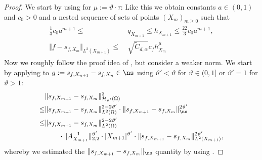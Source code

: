 \documentclass[a4paper, 10pt]{article}
\begin{document}
%
%
%
%
%
%
%
%


\begin{proof}
We start by using  for $\mu := \vartheta \cdot \tau$:
Like this we obtain constants $a \in (0, 1)$ and $c_0 > 0$ and a nested sequence of sets of points $(X_m)_{m \geq 0}$ such that
\begin{align}
\begin{aligned}
\label{eq:proof:properties_sequence}
\frac{1}{3} c_0 a^{m+1} \leq& ~ q_{X_{m+1}} \leq h_{X_{m+1}} \leq \frac{22}{3} c_0 a^{m+1}, \\
%
\Vert f - s_{f, X_m} \Vert_{L^2(X_{m+1})} \leq& ~ \sqrt{\tilde{C}_{d,\alpha}} c_f h_{X_m}^{\mu}
\end{aligned}
\end{align}
Now we roughly follow the proof idea of \cite[Theorem 6.1]{schaback2002inverse}, but consider a weaker norm. %
We start by applying  to $g := s_{f, X_{n+1}} - s_{f, X_n} \in \ns$ using $\vartheta' < \vartheta$ for $\vartheta \in (0, 1]$ or $\vartheta' = 1$ for $\vartheta > 1$:
\begin{align}
\begin{aligned}
\label{eq:application_hoelder}
&\Vert s_{f, X_{m+1}} - s_{f, X_{m}} \Vert_{\mathcal{H}_{\vartheta'}(\Omega)}^2 \\
\leq& \Vert s_{f, X_{m+1}} - s_{f, X_{m}} \Vert_{L^2(\Omega)}^{2 - 2\vartheta'} \cdot \Vert s_{f, X_{m+1}} - s_{f, X_{m}} \Vert_{\ns}^{2\vartheta'} \\
\leq &\Vert s_{f, X_{m+1}} - s_{f, X_{m}} \Vert_{L^2(\Omega)}^{2 - 2\vartheta'} \\ 
&\qquad \cdot \Vert A_{X_{m+1}}^{-1} \Vert_{2,2}^{\vartheta'} \cdot |X_{m+1}|^{\vartheta'} \cdot \Vert s_{f, X_{m+1}} - s_{f, X_{m}} \Vert_{L^2(X_{m+1})}^{2\vartheta'},
\end{aligned}
\end{align}
whereby we estimated the $\Vert s_{f, X_{m+1}} - s_{f, X_{m}} \Vert_{\ns}$ quantity by using .
%
%
%


\end{proof}
\end{document}
